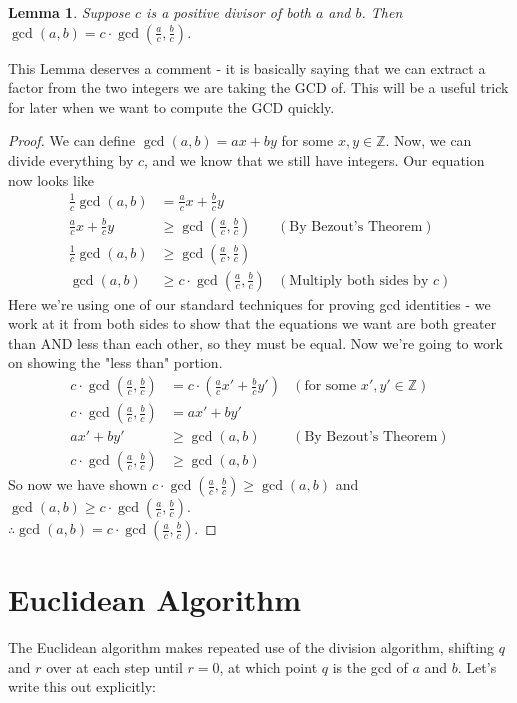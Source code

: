 \documentclass[10pt]{article}
\newcommand{\Z}{\mathbb{Z}}
\newtheorem{lemma}[theorem]{Lemma}
\theoremstyle{definition}
\theoremstyle{remark}
\def\Z{\mathbb{ Z}}
\begin{document}
\begin{lemma}
Suppose $c$ is a positive divisor of both $a$ and $b$.  Then $\gcd(a,b) = c \cdot \gcd(\frac{a}{c}, \frac{b}{c})$.
\end{lemma}
This Lemma deserves a comment - it is basically saying that we can extract a factor from the two integers we are taking the GCD of.  This will be a useful trick for later when we want to compute the GCD quickly.
\begin{proof}
We can define $\gcd(a,b) = ax + by$ for some $x,y \in \Z$.  Now, we can divide everything by $c$, and we know that we still have integers.  Our equation now looks like
\begin{align*}
\frac{1}{c} \gcd(a,b) &= \frac{a}{c} x + \frac{b}{c} y\\
\frac{a}{c} x + \frac{b}{c} y &\geq \gcd(\frac{a}{c},\frac{b}{c})  &(\text{By Bezout's Theorem})\\
\frac{1}{c} \gcd(a,b) &\geq \gcd(\frac{a}{c},\frac{b}{c}) \\
\gcd(a,b) &\geq c \cdot \gcd(\frac{a}{c},\frac{b}{c}) &(\text{Multiply both sides by $c$})
\end{align*}
Here we're using one of our standard techniques for proving gcd identities - we work at it from both sides to show that the equations we want are both greater than AND less than each other, so they must be equal.  Now we're going to work on showing the "less than" portion.\\
\begin{align*}
c \cdot \gcd(\frac{a}{c},\frac{b}{c}) &= c \cdot (\frac{a}{c} x' + \frac{b}{c} y') &(\text{for some $x',y' \in \Z$})\\
c \cdot \gcd(\frac{a}{c},\frac{b}{c}) &= ax' + by'\\
ax' + by' &\geq \gcd(a,b)   &(\text{By Bezout's Theorem})\\
c \cdot \gcd(\frac{a}{c},\frac{b}{c}) &\geq \gcd(a,b) 
\end{align*}
So now we have shown $c \cdot \gcd(\frac{a}{c},\frac{b}{c}) \geq \gcd(a,b)$ and $\gcd(a,b) \geq c \cdot \gcd(\frac{a}{c},\frac{b}{c})$.\\

$\therefore \gcd(a,b) = c \cdot \gcd(\frac{a}{c}, \frac{b}{c})$.

\end{proof}

\section{Euclidean Algorithm}
The Euclidean algorithm makes repeated use of the division algorithm, shifting $q$ and $r$ over at each step until $r=0$, at which point $q$ is the gcd of $a$ and $b$.  Let's write this out explicitly:
\end{document}
